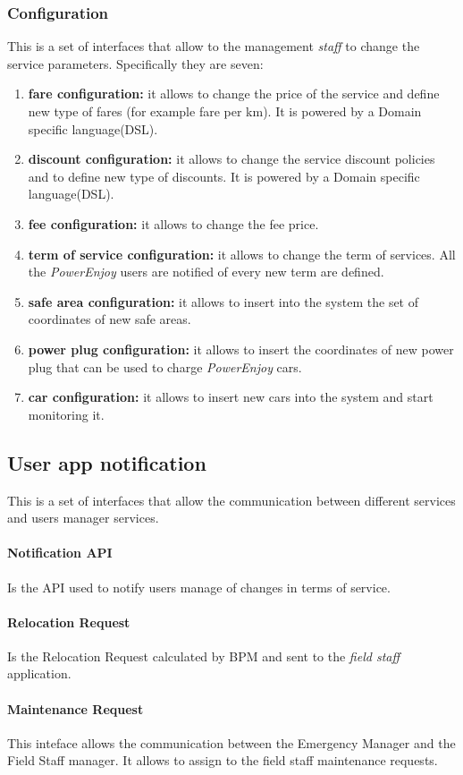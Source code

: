 \documentclass[english]{article}
\newcommand{\powerenjoy}{\textit{PowerEnjoy }}
\newcommand{\staff}{\textit{staff }}
\newcommand{\fieldstaff}{\textit{field staff }}
\begin{document}
	\subsubsection*{Configuration}
	This is a set of interfaces that allow to the management \staff to change the service parameters.
	Specifically they are seven:
	\begin{enumerate} 
		\item \textbf{fare configuration:} it allows to change the price of the service and define new type of fares (for example fare per km). It is powered by a Domain specific language(DSL).
		\item \textbf{discount configuration:} it allows to change the service discount policies and to define new type of discounts. It is powered by a Domain specific language(DSL).
		\item \textbf{fee configuration:} it allows to change the fee price.
		\item \textbf{term of service configuration:} it allows to change the term of services. All the \powerenjoy users are notified of every new term are defined.
		\item\textbf{safe area configuration:} it allows to insert into the system the set of coordinates of new safe areas.
		\item \textbf{power plug configuration:} it allows to insert the coordinates of new power plug that can be used to charge \powerenjoy cars.
		\item \textbf{car configuration:} it allows to insert new cars into the system and start monitoring it.
	\end{enumerate}
	\subsection*{User app notification}
	This is a set of interfaces that allow the communication between different services and users manager services.
		\paragraph{Notification API}
		Is the API used to notify users manage of changes in terms of service. 
		\paragraph{Relocation Request}
		Is the Relocation Request calculated by BPM and sent to the \fieldstaff application.
		\paragraph{Maintenance Request}
		This inteface allows the communication between the Emergency Manager and the Field Staff manager. It allows to assign to the field staff maintenance requests. 
\end{document}
